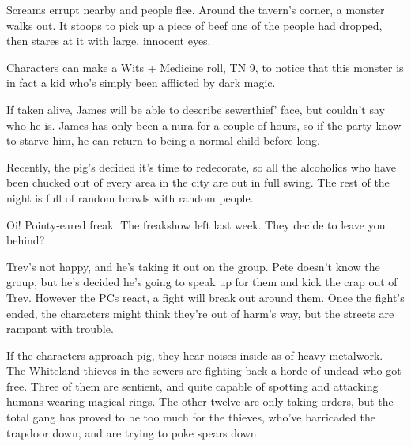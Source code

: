 \begin{multicols}{2}
\begin{boxtext}

	Screams errupt nearby and people flee.  Around the tavern's corner, a monster walks out.  It stoops to pick up a piece of beef one of the people had dropped, then stares at it with large, innocent eyes.

\end{boxtext}

Characters can make a Wits + Medicine roll, TN 9, to notice that this monster is in fact a kid who's simply been afflicted by dark magic.


\deephobgoblin

If taken alive, James will be able to describe \gls{sewerthief}' face, but couldn't say who he is.
James has only been a nura for a couple of hours, so if the party know to starve him, he can return to being a normal child before long.


Recently, the \gls{pig}'s decided it's time to redecorate, so all the alcoholics who have been chucked out of every area in the city are out in full swing.
The rest of the night is full of random brawls with random people.

\begin{boxtext}

	Oi! Pointy-eared freak.  The freakshow left last week.  They decide to leave you behind?

\end{boxtext}

Trev's not happy, and he's taking it out on the group.
Pete doesn't know the group, but he's decided he's going to speak up for them and kick the crap out of Trev.
However the PCs react, a fight will break out around them.
Once the fight's ended, the characters might think they're out of harm's way, but the streets are rampant with trouble.


\humanfarmer

If the characters approach \gls{pig}, they hear noises inside as of heavy metalwork.  The Whiteland thieves in the sewers are fighting back a horde of undead who got free.  Three of them are sentient, and quite capable of spotting and attacking humans wearing magical rings.  The other twelve are only taking orders, but the total gang has proved to be too much for the thieves, who've barricaded the trapdoor down, and are trying to poke spears down.


\end{multicols}
